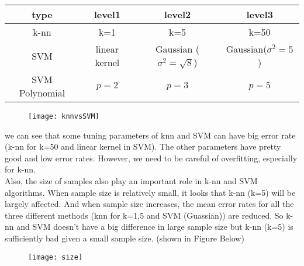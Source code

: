 \documentclass{article}
\begin{document}
\begin{table}[H]
\centering
\begin{tabular}{|c|c|c|c|}
\hline
type&level1&level2&level3\\
\hline
k-nn& k=1&k=5&k=50\\
\hline
SVM& linear kernel& Gaussian ($\sigma^2=\sqrt{8}$)&Gaussian($\sigma^2=5$)\\
\hline
SVM Polynomial& $p=2$& $p=3$&$p=5$\\
\hline
\end{tabular}
\end{table}

\begin{figure}[H]
\centering
\texttt{[image: knnvsSVM]}
\caption{}
\label{fig:larynx}
\end{figure}
 
we can see that some tuning parameters of knn and SVM can have big error rate (k-nn for k=50 and linear kernel in SVM). The other parameters have pretty good and low error rates. However, we need to be careful of overfitting, especially for k-nn. \\

Also, the size of samples also play an important role in k-nn and SVM algorithms. When sample size is relatively small, it looks that k-nn (k=5) will be largely affected. And when sample size increases, the mean error rates for all the three different methods (knn for k=1,5 and SVM (Guassian)) are reduced. So k-nn and SVM doesn't have a big difference in large sample size but k-nn (k=5) is sufficiently bad given a small sample size. (shown in Figure Below)

\begin{figure}[H]
	\centering
	\texttt{[image: size]}
	\caption{}
	\label{fig:larynx}
\end{figure}


\end{document}
